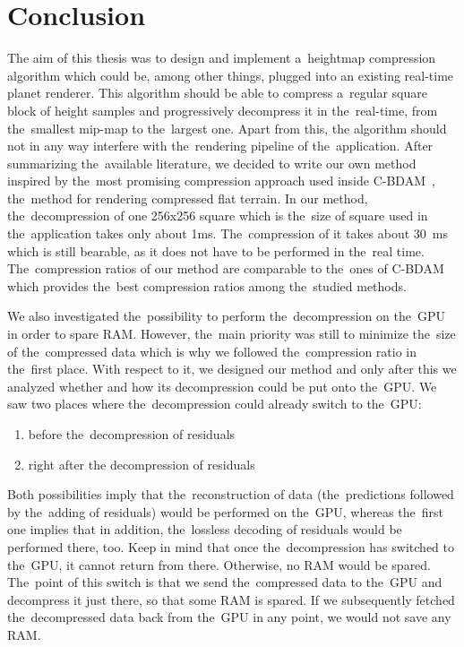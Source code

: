 \chapter*{Conclusion}\label{chap:conclusion}

The aim of this thesis was to design and implement a~heightmap compression algorithm which could be, among other things, plugged into an existing real-time planet renderer. This algorithm should be able to compress a~regular square block of height samples and progressively decompress it in the~real-time, from the~smallest mip-map to the~largest one. Apart from this, the algorithm should not in any way interfere with the~rendering pipeline of the~application. After summarizing the~available literature, we decided to write our own method inspired by the~most promising compression approach used inside C-BDAM~\cite{cbdam}, the~method for rendering compressed flat terrain. In our method, the~decompression of one 256x256 square which is the~size of square used in the~application takes only about 1ms. The~compression of it takes about 30~ms which is still bearable, as it does not have to be performed in the~real time. The~compression ratios of our method are comparable to the~ones of C-BDAM which provides the~best compression ratios among the~studied methods.

We also investigated the~possibility to perform the~decompression on the~GPU in order to spare RAM. However, the~main priority was still to minimize the~size of the~compressed data which is why we followed the~compression ratio in the~first place. With respect to it, we designed our method and only after this we analyzed whether and how its decompression could be put onto the~GPU. We saw two places where the~decompression could already switch to the~GPU:
\begin{enumerate}
	\item{before the~decompression of residuals}
	\item{right after the decompression of residuals}
\end{enumerate}

Both possibilities imply that the~reconstruction of data (the~predictions followed by the~adding of residuals) would be performed on the~GPU, whereas the~first one implies that in addition, the~lossless decoding of residuals would be performed there, too. Keep in mind that once the~decompression has switched to the~GPU, it cannot return from there. Otherwise, no RAM would be spared. The~point of this switch is that we send the~compressed data to the~GPU and decompress it just there, so that some RAM is spared. If we subsequently fetched the~decompressed data back from the~GPU in any point, we would not save any RAM.

